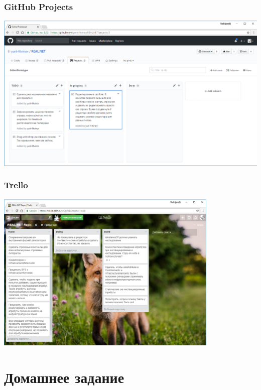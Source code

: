 \documentclass[xetex,mathserif,serif]{beamer}
\begin{document}
	\begin{frame}
		\frametitle{GitHub Projects}
		\begin{center}
			\includegraphics[width=\textwidth]{githubProjects.png}
		\end{center}
	\end{frame}

	\begin{frame}
		\frametitle{Trello}
		\begin{center}
			\includegraphics[width=0.8\textwidth]{trello.png}
		\end{center}
	\end{frame}

	\section{Домашнее задание}
	
\end{document}
